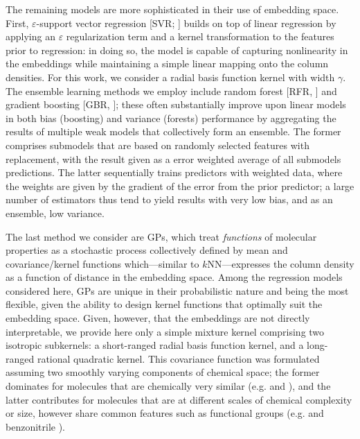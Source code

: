 \documentclass[twocolumn]{aastex63}
\begin{document}
The remaining models are more sophisticated in their use of embedding space. First, $\varepsilon$-support vector regression [SVR; \citep{drucker_support_1996,platt_probabilistic_1999}] builds on top of linear regression by applying an $\varepsilon$ regularization term and a kernel transformation to the features prior to regression: in doing so, the model is capable of capturing nonlinearity in the embeddings while maintaining a simple linear mapping onto the column densities. For this work, we consider a radial basis function kernel with width $\gamma$. The ensemble learning methods we employ include random forest [RFR, \citep{liaw_classification_2002}] and gradient boosting [GBR, \citep{friedman_stochastic_2002}]; these often substantially improve upon linear models in both bias (boosting) and variance (forests) performance by aggregating the results of multiple weak models that collectively form an ensemble. The former comprises submodels that are based on randomly selected features with replacement, with the result given as a error weighted average of all submodels predictions. The latter sequentially trains predictors with weighted data, where the weights are given by the gradient of the error from the prior predictor; a large number of estimators thus tend to yield results with very low bias, and as an ensemble, low variance. 

The last method we consider are GPs, which treat \emph{functions} of molecular properties as a stochastic process collectively defined by mean and covariance/kernel functions which---similar to $k$NN---expresses the column density as a function of distance in the embedding space. Among the regression models considered here, GPs are unique in their probabilistic nature and being the most flexible, given the ability to design kernel functions that optimally suit the embedding space. Given, however, that the embeddings are not directly interpretable, we provide here only a simple mixture kernel comprising two isotropic subkernels: a short-ranged radial basis function kernel, and a long-ranged rational quadratic kernel. This covariance function was formulated assuming two smoothly varying components of chemical space; the former dominates for molecules that are chemically very similar (e.g.  and ), and the latter contributes for molecules that are at different scales of chemical complexity or size, however share common features such as functional groups (e.g.  and benzonitrile ).
\end{document}
